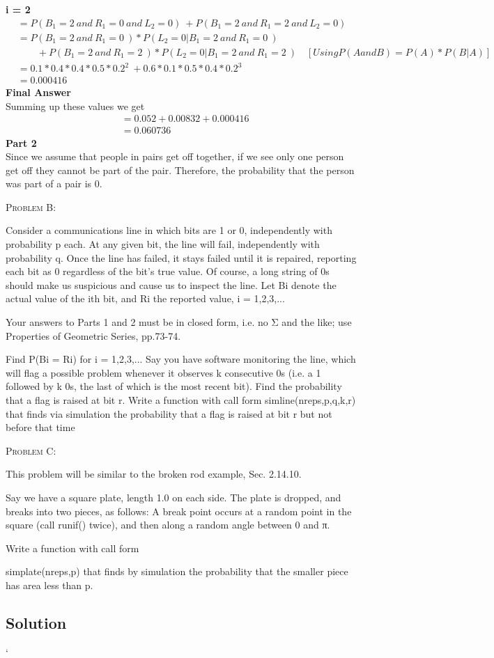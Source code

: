 \documentclass[12pt]{article}
\newenvironment{statement}[1]
{\begin{mdframed}[linewidth=0.6pt]
        \textsc{ #1:}

}
    {\end{mdframed}}
\begin{document}
\textbf{i = 2 }\\
\begin{align}
 & = P(B_1=2\ and\ R_1=0\ and\ L_2= 0)\ +  P(B_1=2\ and\ R_1=2\ and\ L_2= 0)   \nonumber \\
 & = P(B_1=2\ and\ R_1=0\ ) * P(L_2=0 |B_1=2\ and\ R_1=0\ )    \nonumber \\
 & \qquad + P(B_1=2\ and\ R_1=2\ ) * P(L_2=0 |B_1=2\ and\ R_1=2\ )\quad [Using  P(A and B) = P(A) * P(B|A)] \nonumber \\
 & = 0.1*0.4*0.4*0.5*0.2^2\ + 0.6*0.1*0.5*0.4*0.2^3  \nonumber\\
 & = 0.000416 \nonumber
\end{align}
\textbf{Final Answer}\\
Summing up these values we get 
\begin{align}
    & = 0.052 + 0.00832 + 0.000416 \nonumber\\
    & = 0.060736 \nonumber
\end{align}
\textbf{Part 2}\\
Since we assume that people in pairs get off together, if we see only one person get off they cannot be part of the pair. Therefore, the probability that the person was part of a pair is 0.
\newpage
\begin{statement}{Problem B}
Consider a communications line in which bits are 1 or 0, independently with probability p each. At any given bit, the line will fail, independently with probability q. Once the line has failed, it stays failed until it is repaired, reporting each bit as 0 regardless of the bit's true value. Of course, a long string of 0s should make us suspicious and cause us to inspect the line. Let Bi denote the actual value of the ith bit, and Ri the reported value, i = 1,2,3,...

Your answers to Parts 1 and 2 must be in closed form, i.e. no Σ and the like; use Properties of Geometric Series, pp.73-74.

Find P(Bi = Ri) for i = 1,2,3,...
Say you have software monitoring the line, which will flag a possible problem whenever it observes k consecutive 0s (i.e. a 1 followed by k 0s, the last of which is the most recent bit). Find the probability that a flag is raised at bit r.
Write a function with call form
simline(nreps,p,q,k,r)
that finds via simulation the probability that a flag is raised at bit r but not before that time

\end{statement}
\newpage
\begin{statement}{Problem C}
This problem will be similar to the broken rod example, Sec. 2.14.10.

Say we have a square plate, length 1.0 on each side. The plate is dropped, and breaks into two pieces, as follows: A break point occurs at a random point in the square (call runif() twice), and then along a random angle between 0 and π.

Write a function with call form

simplate(nreps,p)
that finds by simulation the probability that the smaller piece has area less than p.
\end{statement}
\subsection*{Solution}

 




`
\end{document}
